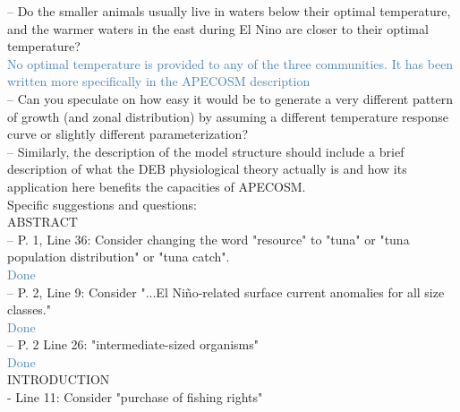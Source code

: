 \documentclass[12pt]{article}
\newcommand{\resp}[1]{\textcolor{SteelBlue}{#1}}
\begin{document}

-- Do the smaller animals usually live in waters below their optimal temperature, and the warmer waters in the east during El Nino are closer to their optimal temperature?\\

\resp{No optimal temperature is provided to any of the three communities. It has been written more specifically in the APECOSM description}\\

-- Can you speculate on how easy it would be to generate a very different pattern of growth (and zonal distribution) by assuming a different temperature response curve or slightly different parameterization?\\


-- Similarly, the description of the model structure should include a brief description of what the DEB physiological theory actually is and how its application here benefits the capacities of APECOSM.\\


Specific suggestions and questions:\\

ABSTRACT\\

-- P. 1, Line 36: Consider changing the word "resource" to "tuna" or "tuna population distribution" or "tuna catch".\\

\resp{Done} \\

-- P. 2, Line 9: Consider "...El Niño-related surface current anomalies for all size classes."\\

\resp{Done}\\

-- P. 2 Line 26: "intermediate-sized organisms"\\

\resp{Done}\\

INTRODUCTION\\

- Line 11: Consider "purchase of fishing rights"\\
\end{document}
